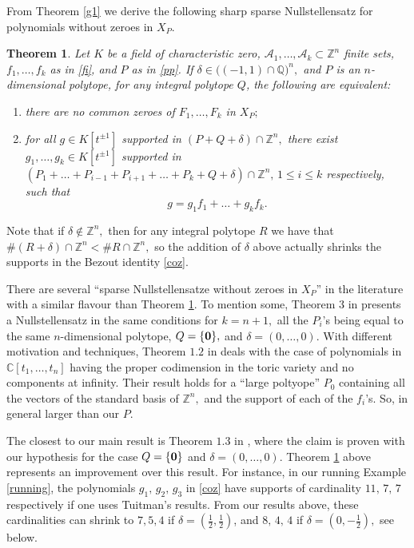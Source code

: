 \documentclass[a4paper,11pt]{amsart}
\newcommand{\C}{\mathbb{C}}
\newcommand{\Q}{\mathbb{Q}}
\newcommand{\Z}{\mathbb{Z}}
\newcommand{\cA}{{\mathcal A}}
\newcounter{thm}
\numberwithin{thm}{section}
\numberwithin{equation}{section}
\theoremstyle{definition}
\theoremstyle{plain}
\newtheorem{theorem}[thm]{Theorem}
\begin{document}
From Theorem \ref{g1} we derive the following sharp sparse Nullstellensatz for polynomials without zeroes in $X_P.$
\begin{theorem}\label{spr}
Let $K$ be a field of characteristic zero,  $\cA_1,\ldots, \cA_{k}\subset\Z^n$ finite sets, $f_1,\ldots, f_k$ as in \eqref{fi}, and $P$ as in \eqref{pp}. If $\delta\in\big((-1,1)\cap\Q\big)^n,$ and $P$ is an $n$-dimensional polytope, 
for any integral polytope $Q$, the following are equivalent:
\begin{enumerate}
\item there are no common zeroes of $F_1,\ldots, F_k$ in $X_P;$
\item for all $g\in K[t^{\pm1}]$ supported in $(P+Q+\delta)\cap\Z^n,$ there exist $g_1,\ldots, g_k\in K[t^{\pm1}]$ supported in $(P_1+\ldots +P_{i-1}+P_{i+1}+\ldots+P_k+Q+\delta)\cap\Z^n,\,1\leq i\leq k$ respectively, such that
\begin{equation}\label{coz}
g=g_1f_1+\ldots+g_kf_k.
\end{equation}
\end{enumerate}
\end{theorem}


Note that if $\delta\notin\Z^n,$  then for any integral polytope $R$ we have that $\#(R+\delta)\cap\Z^n<\#R\cap\Z^n,$ so the addition of $\delta$ above actually shrinks the supports in the Bezout identity \eqref{coz}.

There are several ``sparse Nullstellensatze without zeroes in $X_P$'' in the literature with a similar flavour than Theorem \ref{spr}.  To mention some,  Theorem $3$ in \cite{CDV06}  presents a Nullstellensatz in the same conditions for $k=n+1,$ all the $P_i$'s being equal to the same $n$-dimensional polytope, $Q=\{\bf0\},$ and $\delta=(0,\ldots, 0).$
With different motivation and techniques,  Theorem $1.2$ in \cite{wul11} deals with the case of polynomials in $\C[t_1,\ldots, t_n]$  having the proper codimension in the toric variety and no components at infinity. Their result holds for a ``large poltyope''  $P_0$  containing all the vectors of the standard basis of $\Z^n,$ and the support of each of the $f_i$'s. So, in general larger than our $P$. 
 

The closest to our main result is Theorem $1.3$ in \cite{tui11}, where the claim is proven with our hypothesis for the case  $Q=\{\bf0\}$ and  $\delta=(0,\ldots, 0).$ Theorem \ref{spr} above represents an improvement over this result. For instance, in our running Example \ref{running},  the polynomials $g_1, \, g_2,\, g_3$ in \eqref{coz} have supports of cardinality $11,\, 7,\,7$  respectively if one uses Tuitman's results. 
From our results above, these cardinalities can shrink to $7, 5 ,4$ if $\delta=(\frac12,\frac12)$, and $8,\,4,\,4$  if $\delta=(0,-\frac12),$ see below.
\end{document}
